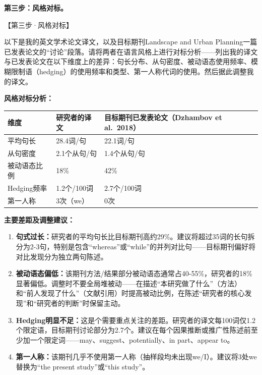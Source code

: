 \medskip
\textbf{第三步：风格对标。}

\begin{userbox}
【第三步·风格对标】

以下是我的英文学术论文译文，以及目标期刊Landscape and Urban Planning一篇已发表论文的``讨论''段落。请将两者在语言风格上进行对标分析——列出我的译文与已发表论文在以下维度上的差异：句长分布、从句密度、被动语态使用频率、模糊限制语（hedging）的使用频率和类型、第一人称代词的使用。然后据此调整我的译文。
\end{userbox}

\begin{aibox}
\textbf{风格对标分析：}

\begin{formalTable}[H]
\begin{tabular}{p{3.5cm} p{3.5cm} p{3.5cm}}
\toprule
\textbf{维度} & \textbf{研究者的译文} & \textbf{目标期刊已发表论文（Dzhambov et al.\ 2018）}\\
\midrule
平均句长 & 28.4词/句 & 22.1词/句 \\
从句密度 & 2.1个从句/句 & 1.4个从句/句 \\
被动语态比例 & 18\% & 42\% \\
Hedging频率 & 1.2个/100词 & 2.7个/100词 \\
第一人称 & 3次（we） & 0次 \\
\bottomrule
\end{tabular}
\end{formalTable}

\smallskip
\textbf{主要差距及调整建议：}
\begin{enumerate}[nosep]
\item \textbf{句式过长：}研究者的平均句长比目标期刊高约29\%。建议将超过35词的长句拆分为2-3句，特别是包含``whereas''或``while''的并列对比句——目标期刊偏好将对比发现分为独立两句陈述。
\item \textbf{被动语态偏低：}该期刊方法/结果部分被动语态通常占40-55\%，研究者的18\%显著偏低。调整时不要全局堆被动——在描述``本研究做了什么''（方法）和``前人发现了什么''（文献引用）时提高被动比例，在陈述``研究者的核心发现''和``研究者的判断''时保留主动。
\item \textbf{Hedging明显不足：}这是个需要重点关注的差距。研究者的译文每100词仅1.2个限定语，目标期刊讨论部分为2.7个。建议在每个因果推断或推广性陈述前至少加一个限定词——may、suggest、potentially、in part、appear to。
\item \textbf{第一人称：}该期刊几乎不使用第一人称（抽样段均未出现we/I）。建议将3处we替换为``the present study''或``this study''。
\end{enumerate}
\end{aibox}

